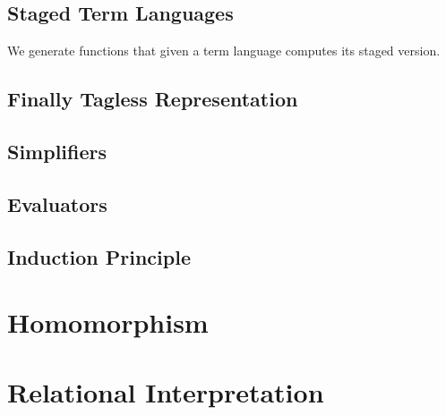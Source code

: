 \subsection{Staged Term Languages}
We generate functions that given a term language computes its staged version. 

\subsection{Finally Tagless Representation}

\subsection{Simplifiers}

\subsection{Evaluators}

\subsection{Induction Principle}



\section{Homomorphism}

\section{Relational Interpretation}


